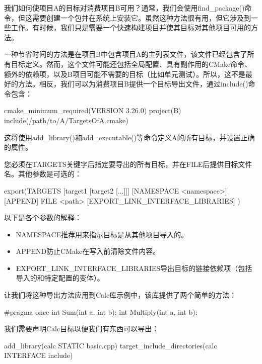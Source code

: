 我们如何使项目A的目标对消费项目B可用？通常，我们会使用find\_package()命令，但这需要创建一个包并在系统上安装它。虽然这种方法很有用，但它涉及到一些工作。有时候，我们只是需要一个快速构建项目并使其目标对其他项目可用的方法。

一种节省时间的方法是在项目B中包含项目A的主列表文件，该文件已经包含了所有目标定义。然而，这个文件可能还包括全局配置、具有副作用的CMake命令、额外的依赖项，以及B项目可能不需要的目标（比如单元测试）。所以，这不是最好的方法。相反，我们可以为消费项目B提供一个目标导出文件，通过include()命令包含：

\begin{cmake}
cmake_minimum_required(VERSION 3.26.0)
project(B)
include(/path/to/A/TargetsOfA.cmake)
\end{cmake}

这将使用add\_library()和add\_executable()等命令定义A的所有目标，并设置正确的属性。

您必须在TARGETS关键字后指定要导出的所有目标，并在FILE后提供目标文件名。其他参数是可选的：

\begin{shell}
export(TARGETS [target1 [target2 [...]]]
       [NAMESPACE <namespace>] [APPEND] FILE <path>
       [EXPORT_LINK_INTERFACE_LIBRARIES]
)
\end{shell}

以下是各个参数的解释：

\begin{itemize}
\item
NAMESPACE推荐用来指示目标是从其他项目导入的。

\item
APPEND防止CMake在写入前清除文件内容。

\item
EXPORT\_LINK\_INTERFACE\_LIBRARIES导出目标的链接依赖项（包括导入的和特定配置的变体）。
\end{itemize}

让我们将这种导出方法应用到Calc库示例中，该库提供了两个简单的方法：


\begin{cpp}
#pragma once
int Sum(int a, int b);
int Multiply(int a, int b);
\end{cpp}

我们需要声明Calc目标以便我们有东西可以导出：


\begin{cmake}
add_library(calc STATIC basic.cpp)
target_include_directories(calc INTERFACE include)
\end{cmake}

